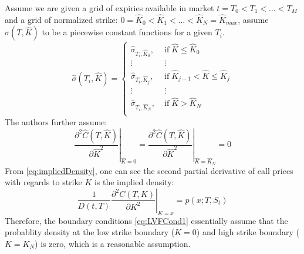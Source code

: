 \documentclass[letterpaper,12pt,titlepage,oneside,final]{book}
\numberwithin{equation}{section}
\theoremstyle{definition}
\begin{document}
Assume we are given a grid of expiries available in market $t=T_0 < T_1 < \dots< T_{M} $ and  a grid of normalized strike: $0=\widehat{K}_0<\widehat{K}_1<\dots<\widehat{K}_{N}=\widehat{K}_{max}$, \citet{andreasen2010volatility} assume $\widehat{\sigma}(T,\widehat{K})$  to be a piecewise constant functions for a given $T_i$.
\begin{equation}
	\widehat{\sigma}(T_i,\widehat{K})=\left\{ \begin{array}{ll}
		\widehat{\sigma}_{T_i,\widehat{K}_0}  , \; &\text{if} \; \widehat{K} \leq \widehat{K}_0\\
		\vdots & \vdots\\
		\widehat{\sigma}_{T_i,\widehat{K}_j}  , \; &\text{if} \; \widehat{K}_{j-1}<\widehat{K} \leq \widehat{K}_j\\
		\vdots & \vdots\\
		\widehat{\sigma}_{T_i,\widehat{K}_{N}} , \; &\text{if} \;  \widehat{K} > \widehat{K}_{N} \\
		\end{array} \right.
		\label{eq:LVFVolDef}
	\end{equation}
The authors further assume:
\begin{equation}
	\left. \frac{\partial^2 \widehat{C}(T,\widehat{K})}{ \partial \widehat{K}^2}\right\vert_{\widehat{K}=0}=\left. \frac{\partial^2 \widehat{C}(T,\widehat{K})}{ \partial \widehat{K}^2}\right\vert_{\widehat{K}=\widehat{K}_{N}}=0
 \label{eq:LVFCond1}
\end{equation}
From \eqref{eq:impliedDensity}, one can see the second partial derivative of call prices with regards to strike $K$ is the implied density:
\[
	\frac{1}{D(t,T)} \left. \frac{\partial^2 C(T,K)}{\partial K^2} \right\vert_{K=x}=	p(x;T,S_t) 
\]
 Therefore, the boundary conditions \eqref{eq:LVFCond1} essentially assume that the probablity density at the  low strike boundary ($K=0$) and  high strike boundary ($K=K_{N}$) is zero, which is a reasonable assumption.
\end{document}
